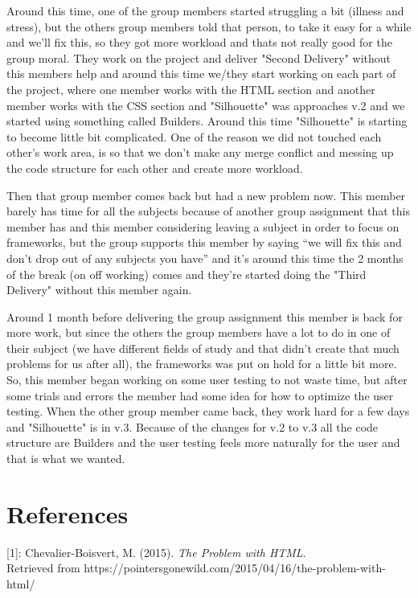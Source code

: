 \documentclass[12pt]{article}
\begin{document}
    Around this time, one of the group members started struggling a bit (illness and stress), but the others group members told that person, to take it easy for a while and we'll fix this, so they got more workload and thats not really good for the group moral. They work on the project and deliver "Second Delivery" without this members help and around this time we/they start working on each part of the project, where one member works with the HTML section and another member works with the CSS section and "Silhouette" was approaches v.2 and we started using something called Builders. Around this time "Silhouette" is starting to become little bit complicated. One of the reason we did not touched each other's work area, is so that we don't make any merge conflict and messing up the code structure for each other and create more workload.

    Then that group member comes back but had a new problem now. This member barely has time for all the subjects because of another group assignment that this member has and this member considering leaving a subject in order to focus on frameworks, but the group supports this member by saying “we will fix this and don't drop out of any subjects you have” and it's around this time the 2 months of the break (on off working) comes and they're started doing the "Third Delivery" without this member again.

    Around 1 month before delivering the group assignment this member is back for more work, but since the others the group members have a lot to do in one of their subject (we have different fields of study and that didn't create that much problems for us after all), the frameworks was put on hold for a little bit more. So, this member began working on some user testing to not waste time, but after some trials and errors the member had some idea for how to optimize the user testing. When the other group member came back, they work hard for a few days and "Silhouette" is in v.3. Because of the changes for v.2 to v.3 all the code structure are Builders and the user testing feels more naturally for the user and that is what we wanted.

\section{References}

[1]: Chevalier-Boisvert, M. (2015). \textit{The Problem with HTML}. \\ Retrieved from https://pointersgonewild.com/2015/04/16/the-problem-with-html/
\end{document}
